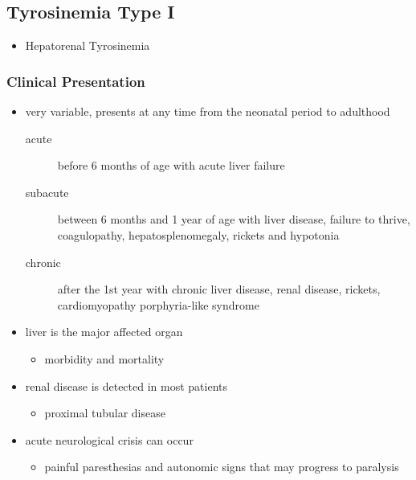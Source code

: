 \documentclass{scrartcl}
\begin{document}
\subsection{Tyrosinemia Type I}
\label{sec:org644ba77}
\begin{itemize}
\item Hepatorenal Tyrosinemia
\end{itemize}
\subsubsection{Clinical Presentation}
\label{sec:orgbcbc28c}
\begin{itemize}
\item very variable, presents at any time from the neonatal period to adulthood
\begin{description}
\item[{acute}] before 6 months of age with acute liver failure
\item[{subacute}] between 6 months and 1 year of age with liver disease,
failure to thrive, coagulopathy, hepatosplenomegaly,
rickets and hypotonia
\item[{chronic}] after the 1st year with chronic liver disease, renal
disease, rickets, cardiomyopathy \textpm{} porphyria-like
syndrome
\end{description}

\item liver is the major affected organ
\begin{itemize}
\item morbidity and mortality
\end{itemize}
\item renal disease is detected in most patients
\begin{itemize}
\item proximal tubular disease
\end{itemize}
\item acute neurological crisis can occur
\begin{itemize}
\item painful paresthesias and autonomic signs that may progress to
paralysis
\end{itemize}
\end{itemize}
\end{document}
